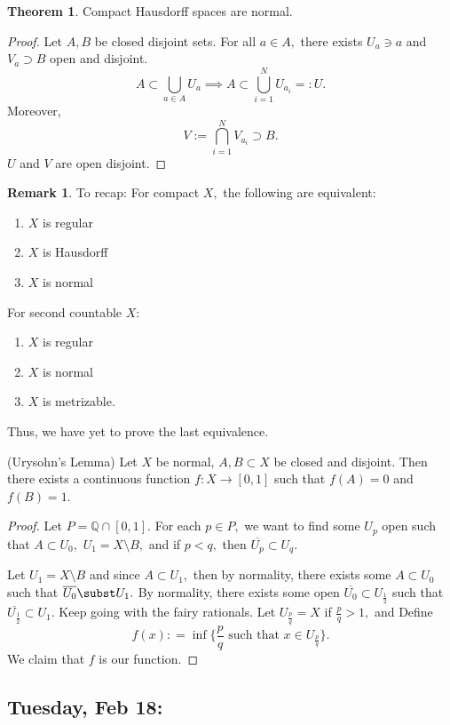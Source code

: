 \documentclass[10pt, oneside]{article}
\newcommand{\bbQ}{\mathbb{Q}}
\theoremstyle{definition}
\newtheorem{thm}{Theorem}
\newtheorem{rem}{Remark}
\begin{document}
\begin{thm}
    Compact Hausdorff spaces are normal. 
\end{thm}
\begin{proof}
    Let $A,B$ be closed disjoint sets. For all $a\in A,$ there exists $U_a\ni a$ and $V_a \supset B$ open and disjoint. 
    \[A \subset \bigcup_{a\in A} U_a \implies A\subset \bigcup_{i=1}^N U_{a_i} =:U.\] Moreover, 
    \[V:=\bigcap_{i=1}^N V_{a_i}\supset B.\] $U$ and $V$ are open disjoint. 
\end{proof}
\begin{rem}
    To recap:
    For compact $X,$ the following are equivalent:
    \begin{enumerate}
        \item $X$ is regular
        \item $X$ is Hausdorff
        \item $X$ is normal
    \end{enumerate}
    For second countable $X$:
    \begin{enumerate}
        \item $X$ is regular
        \item $X$ is normal
        \item $X$ is metrizable.
    \end{enumerate}
    Thus, we have yet to prove the last equivalence.
\end{rem}
\begin{lemma}
    (Urysohn's Lemma) Let $X$ be normal, $A, B \subset X$ be closed and disjoint. Then there exists a continuous function $f: X\to [0,1]$ such that $f(A) = 0$ and $f(B) = 1.$
\end{lemma}
\begin{proof}
    Let $P = \bbQ \cap [0,1].$ For each $p \in P,$ we want to find some $U_p$ open such that $A\subset U_0,$ $U_1 = X\setminus B,$ and if $p < q,$ then $\overline{U_p}\subset U_q.$

    Let $U_1 = X\setminus B$ and since $A\subset U_1,$ then by normality, there exists some $A\subset U_0$ such that $\overline{U_0}\subst U_1.$ By normality, there exists some open $\overline{U_0}\subset U_\frac{1}{2}$ such that $\overline{U_\frac{1}{2}}\subset U_1.$ Keep going with the fairy rationals. Let $U_\frac{p}{q} = X$ if $\frac{p}{q} >1,$ and Define 
    \[f(x): = \inf\{\frac{p}{q}\text{ such that } x\in U_\frac{p}{q}\}.\] We claim that $f$ is our function.
\end{proof}

\newpage
\subsection{Tuesday, Feb 18:}
\end{document}
